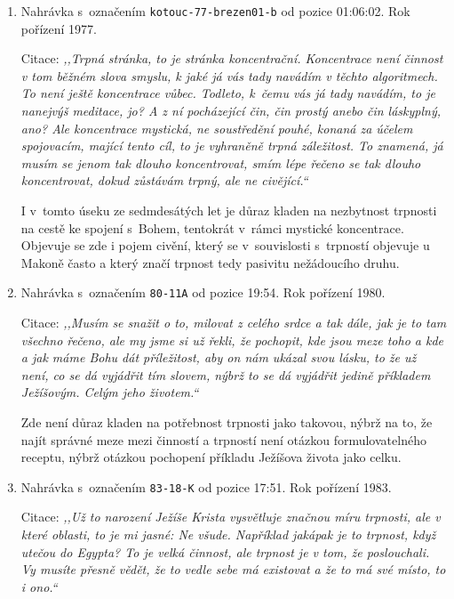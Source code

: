 \begin{enumerate}
{    Příklad školy Karla Weinfurtera z~pohledu Karla Makoně je užit pro
    demonstraci nezbytnosti trpného přístupu. Je zde postulována nezbytnost
    trpnosti pro vstup do Království Božího.
  }
  \item{
      Nahrávka s~označením \texttt{kotouc-77-brezen01-b} od pozice 01:06:02. Rok pořízení 1977.

      Citace: \textit{%
        ,,Trpná stránka, to je stránka koncentrační. Koncentrace není činnost v
        tom běžném slova smyslu, k jaké já vás tady navádím v těchto
        algoritmech. To není ještě koncentrace vůbec. Todleto, k~čemu vás
        já tady navádím, to je nanejvýš meditace, jo? A z ní pocházející čin, čin
        prostý anebo čin láskyplný, ano? Ale koncentrace mystická, ne
        soustředění pouhé, konaná za účelem spojovacím, mající tento cíl, to je
        vyhraněně trpná záležitost. To znamená, já musím se jenom tak dlouho
        koncentrovat, smím lépe řečeno se tak dlouho koncentrovat, dokud
        zůstávám trpný, ale ne civějící.``
      }

      I v~tomto úseku ze sedmdesátých let je důraz kladen na nezbytnost trpnosti
      na cestě ke spojení s~Bohem, tentokrát v~rámci mystické koncentrace.
      Objevuje se zde i pojem civění, který se v~souvislosti s~trpností objevuje
      u Makoně často a který značí trpnost tedy pasivitu nežádoucího druhu.
  }
  \item{
      Nahrávka s~označením \texttt{80-11A} od pozice 19:54. Rok pořízení 1980.

      Citace: \textit{%
        ,,Musím se snažit o to, milovat z celého srdce a tak dále, jak je to tam
        všechno řečeno, ale my jsme si už řekli, že pochopit, kde jsou meze toho
        a kde a jak máme Bohu dát příležitost, aby on nám ukázal svou lásku, to
        že už není, co se dá vyjádřit tím slovem, nýbrž to se dá vyjádřit jedině
        příkladem Ježíšovým. Celým jeho životem.``
      }

      Zde není důraz kladen na potřebnost trpnosti jako takovou, nýbrž na to, že
      najít správné meze mezi činností a trpností není otázkou formulovatelného
      receptu, nýbrž otázkou pochopení příkladu Ježíšova života jako celku.
  }
  \item{
      Nahrávka s~označením \texttt{83-18-K} od pozice 17:51. Rok pořízení 1983.

      Citace: \textit{%
        ,,Už to narození Ježíše Krista vysvětluje značnou míru trpnosti, ale v
        které oblasti, to je mi jasné: Ne všude. Například jakápak je to
        trpnost, když utečou do Egypta? To je velká činnost, ale trpnost je v
        tom, že poslouchali. Vy musíte přesně vědět, že to vedle sebe má
        existovat a že to má své místo, to i ono.``
      }

}
\end{enumerate}
